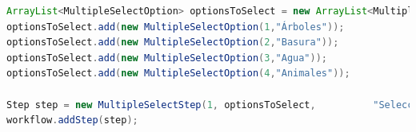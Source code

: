 \begin{lstlisting}[language=Java, frame=tlbr, caption=MultipleSelectStep en Java.]	
ArrayList<MultipleSelectOption> optionsToSelect = new ArrayList<MultipleSelectOption>();
optionsToSelect.add(new MultipleSelectOption(1,"Árboles"));
optionsToSelect.add(new MultipleSelectOption(2,"Basura"));
optionsToSelect.add(new MultipleSelectOption(3,"Agua"));
optionsToSelect.add(new MultipleSelectOption(4,"Animales"));

Step step = new MultipleSelectStep(1, optionsToSelect,          "Seleccione lo que observa", 2);
workflow.addStep(step);
\end{lstlisting}



